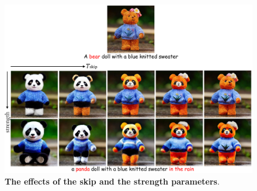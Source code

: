 \begin{figure}[h]
\includegraphics[width=\textwidth]{ICCV23_submission/figures/skip_sclae_balance.pdf}
\caption{\textbf{The effects of the skip and the strength parameters}.}
\label{fig:skip_strength}
\end{figure}




